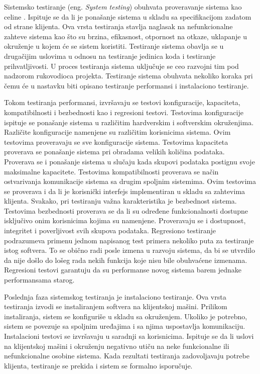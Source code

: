 \documentclass[12pt,oneside]{memoir}
\begin{document}
Sistemsko testiranje (eng. \textit{System testing}) obuhvata proveravanje sistema kao celine \cite{SystemTesting}. Ispituje se da li je ponašanje sistema u skladu sa specifikacijom zadatom od strane klijenta.
Ova vrsta testiranja stavlja naglasak na nefunkcionalne zahteve sistema kao što su brzina, efikasnost, otpornost na otkaze, uklapanje u okruženje u kojem će se sistem koristiti. 
Testiranje sistema obavlja se u drugačijim uslovima u odnosu na testiranje jedinica koda i testiranje prihvatljivosti. 
U proces testiranja sistema uključuje se ceo razvojni tim pod nadzorom rukovodioca projekta.
Testiranje sistema obuhvata nekoliko koraka pri čemu će u nastavku biti opisano testiranje performansi i instalaciono testiranje. 
\par
Tokom testiranja performansi, izvršavaju se testovi konfiguracije, kapaciteta, kompatibilnosti i bezbednosti kao i regresioni testovi. Testovima konfiguracije ispituje se ponašanje sistema u različitim hardverskim i softverskim okruženjima. 
Različite konfiguracije namenjene su različitim korisnicima sistema.
Ovim testovima proveravaju se sve konfiguracije sistema.
Testovima kapaciteta proverava se ponašanje sistema pri obradama velikih količina podataka. 
Proverava se i ponašanje sistema u slučaju kada skupovi podataka postignu svoje maksimalne kapacitete. 
Testovima kompatibilnosti proverava se način ostvarivanja komunikacije sistema sa drugim spoljnim sistemima.
Ovim testovima se proverava i da li je korisnički interfejs implementiran u skladu sa zahtevima klijenta. 
Svakako, pri testiranju važna karakteristika je bezbednost sistema.
Testovima bezbednosti proverava se da li su određene funkcionalnosti dostupne isključivo onim korisnicima kojima su namenjene. Proveravaju se i dostupnost, integritet i poverljivost svih skupova podataka. 
Regresiono testiranje podrazumeva primenu jednom napisanog test primera nekoliko puta za testiranje istog softvera. 
To se obično radi posle izmena u razvoju sistema, da bi se utvrdilo da nije došlo do lošeg rada nekih funkcija koje nisu bile obuhvaćene izmenama. 
Regresioni testovi garantuju da su performanse novog sistema barem jednake performansama starog. 

\par
Poslednja faza sistemskog testiranja je instalaciono testiranje.
Ova vrsta testiranja izvodi se instaliranjem softvera na klijentskoj mašini.
Prilikom instaliranja, sistem se konfiguriše u skladu sa okruženjem.
Ukoliko je potrebno, sistem se povezuje sa spoljnim uređajima i sa njima uspostavlja komunikaciju. 
Instalacioni testovi se izvršavaju u saradnji sa korisnicima. Ispituje se da li uslovi na klijentskoj mašini i okruženju negativno utiču na neke funkcionalne ili nefunkcionalne osobine sistema. 
Kada rezultati testiranja zadovoljavaju potrebe klijenta, testiranje se prekida i sistem se formalno isporučuje.
\par
\end{document}
